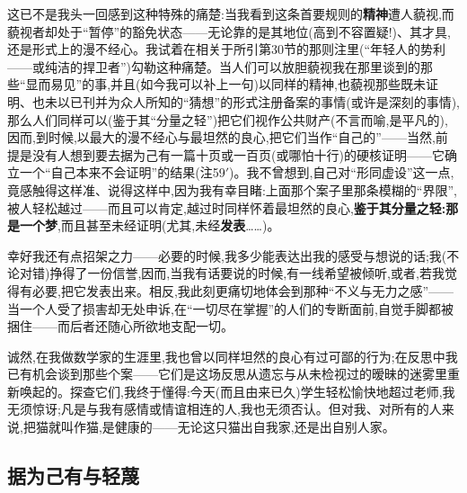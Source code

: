 \pmark {}这已不是我头一回感到这种特殊的痛楚:当我看到这条首要规则的\textbf{精神}遭人藐视,而藐视者却处于“暂停”的豁免状态——无论靠的是其地位(高到不容置疑!)、其才具,还是形式上的漫不经心。我试着在相关于所引第30节的那则注里(“年轻人的势利——或纯洁的捍卫者”)勾勒这种痛楚。当人们可以放胆藐视我在那里谈到的那些“显而易见”的事,并且(如今我可以补上一句)以同样的精神,也藐视那些既未证明、也未以已刊并为众人所知的“猜想”的形式注册备案的事情(或许是深刻的事情),那么人们同样可以(鉴于其“分量之轻”)把它们视作公共财产(不言而喻,是平凡的),因而,到时候,以最大的漫不经心与最坦然的良心,把它们当作“自己的”——当然,前提是没有人想到要去据为己有一篇十页或一百页(或哪怕十行)的硬核证明——它确立一个“自己本来不会证明”的结果(注59$'$)。我不曾想到,自己对“形同虚设”这一点,竟感触得这样准、说得这样中,因为我有幸目睹:上面那个案子里那条模糊的“界限”,被人轻松越过——而且可以肯定,越过时同样怀着最坦然的良心,\textbf{鉴于其分量之轻:那是一个梦},而且甚至未经证明(尤其,未经\textbf{发表}……)。

幸好我还有点招架之力——必要的时候,我多少能表达出我的感受与想说的话;我(不论对错)挣得了一份信誉,因而,当我有话要说的时候,有一线希望被倾听,或者,若我觉得有必要,把它发表出来。相反,我此刻更痛切地体会到那种“不义与无力之感”——当一个人\dmark{}受了损害却无处申诉,在“一切尽在掌握”的人们的专断面前,自觉手脚都被捆住——而后者还随心所欲地支配一切。

诚然,在我做数学家的生涯里,我也曾以同样坦然的良心有过可鄙的行为;在反思中我已有机会谈到那些个案——它们是这场反思从遗忘与从未检视过的暧昧的迷雾里重新唤起的。探查它们,我终于懂得:今天(而且由来已久)学生轻松愉快地超过老师,我无须惊讶;凡是与我有感情或情谊相连的人,我也无须否认。但对我、对所有的人来说,把猫就叫作猫,是健康的——无论这只猫出自我家,还是出自别人家。

\subsection{据为己有与轻蔑}


